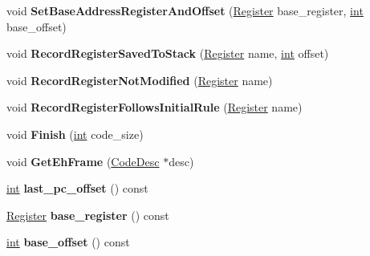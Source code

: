 \begin{DoxyCompactItemize}
void {\bfseries Set\+Base\+Address\+Register\+And\+Offset} (\mbox{\hyperlink{classv8_1_1internal_1_1Register}{Register}} base\+\_\+register, \mbox{\hyperlink{classint}{int}} base\+\_\+offset)
\item 
\mbox{\label{classv8_1_1internal_1_1EhFrameWriter_ad8073b6a559b091df6352983b1c8f1d4}} 
void {\bfseries Record\+Register\+Saved\+To\+Stack} (\mbox{\hyperlink{classv8_1_1internal_1_1Register}{Register}} name, \mbox{\hyperlink{classint}{int}} offset)
\item 
\mbox{\label{classv8_1_1internal_1_1EhFrameWriter_ab83d714a7a9314b0707d92b94cd3ffef}} 
void {\bfseries Record\+Register\+Not\+Modified} (\mbox{\hyperlink{classv8_1_1internal_1_1Register}{Register}} name)
\item 
\mbox{\label{classv8_1_1internal_1_1EhFrameWriter_afe035ab07e88d99e50581c602e6cce4f}} 
void {\bfseries Record\+Register\+Follows\+Initial\+Rule} (\mbox{\hyperlink{classv8_1_1internal_1_1Register}{Register}} name)
\item 
\mbox{\label{classv8_1_1internal_1_1EhFrameWriter_a8cc8e467ec959d5e2294cb3e3f56d817}} 
void {\bfseries Finish} (\mbox{\hyperlink{classint}{int}} code\+\_\+size)
\item 
\mbox{\label{classv8_1_1internal_1_1EhFrameWriter_a931995518514833325c843e344ee0952}} 
void {\bfseries Get\+Eh\+Frame} (\mbox{\hyperlink{structv8_1_1internal_1_1CodeDesc}{Code\+Desc}} $\ast$desc)
\item 
\mbox{\label{classv8_1_1internal_1_1EhFrameWriter_ae9041e85d3a03541d0bfe8307544b88b}} 
\mbox{\hyperlink{classint}{int}} {\bfseries last\+\_\+pc\+\_\+offset} () const
\item 
\mbox{\label{classv8_1_1internal_1_1EhFrameWriter_ae0edab28d7d9aae4328484da1535853c}} 
\mbox{\hyperlink{classv8_1_1internal_1_1Register}{Register}} {\bfseries base\+\_\+register} () const
\item 
\mbox{\label{classv8_1_1internal_1_1EhFrameWriter_a43aa15ce33eb4c82f1f70c51a7bd73db}} 
\mbox{\hyperlink{classint}{int}} {\bfseries base\+\_\+offset} () const
\end{DoxyCompactItemize}
